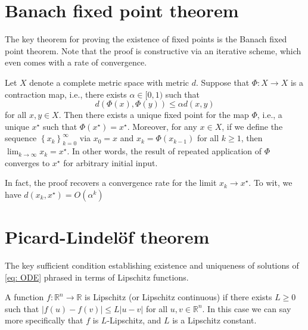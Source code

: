 \section{Banach fixed point theorem}
The key theorem for proving the existence of fixed points is the Banach fixed point theorem. Note that the proof is constructive via an iterative scheme, which even comes with a rate of convergence.


\begin{theorem}
\label{thm: Banach fixed point }
 Let $X$ denote a complete metric space with metric $d$. Suppose that $\Phi: X \rightarrow X$ is a contraction map, i.e., there exists $\alpha \in[0,1)$ such that
$$
d(\Phi(x), \Phi(y)) \leq \alpha d(x, y)
$$
for all $x, y \in X$. Then there exists a unique fixed point for the map $\Phi$, i.e., a unique $x^{\star}$ such that $\Phi\left(x^{\star}\right)=x^{\star}$. Moreover, for any $x \in X$, if we define the sequence $\left\{x_{k}\right\}_{k=0}^{\infty}$ via $x_{0}=x$ and $x_{k}=\Phi\left(x_{k-1}\right)$ for all $k \geq 1$, then $\lim _{k \rightarrow \infty} x_{k}=x^{\star}$. In other words, the result of repeated application of $\Phi$ converges to $x^{\star}$ for arbitrary initial input.
\end{theorem}

\begin{remark}
In fact, the proof recovers a convergence rate for the limit $x_{k} \rightarrow x^{\star}$. To wit, we have $d\left(x_{k}, x^{\star}\right)=O\left(\alpha^{k}\right)$
\end{remark}

\section{Picard-Lindel\"of theorem}
The key sufficient condition establishing existence and uniqueness of solutions of \eqref{eq: ODE} phrased in terms of Lipschitz functions.


\begin{definition}
[Lipschitz]
\label{def: Lipschitz}
A function $f: \mathbb{R}^{n} \rightarrow \mathbb{R}$ is Lipschitz (or Lipschitz continuous) if there exists $L \geq 0$ such that $|f(u)-f(v)| \leq L|u-v|$ for all $u, v \in \mathbb{R}^{n}$. In this case we can say more specifically that $f$ is $L$-Lipschitz, and $L$ is a Lipschitz constant. 
\end{definition}


